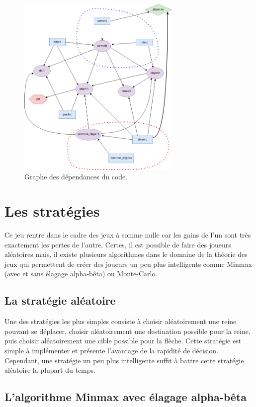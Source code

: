 \documentclass[a4paper]{article}
\begin{document}
\begin{figure}
    \centering
    \includegraphics[width=0.7\textwidth]{dep c.png}
    \caption{Graphe des dépendances du code.}
    \label{fig:dependance}
\end{figure}


\section{Les stratégies}
Ce jeu rentre dans le cadre des jeux à somme nulle car les gains de l'un sont très exactement les pertes de l'autre. Certes, il est possible de faire des joueurs aléatoires mais, il existe plusieurs algorithmes dans le domaine de la théorie des jeux qui permettent de créer des joueurs un peu plus intelligents comme Minmax (avec et sans élagage alpha-bêta) ou Monte-Carlo.
\subsection{La stratégie aléatoire}
Une des stratégies les plus simples consiste à choisir aléatoirement une reine pouvant se déplacer, choisir aléatoirement une destination possible pour la reine, puis choisir aléatoirement une cible possible pour la flèche.
Cette stratégie est simple à implémenter et présente l'avantage de la rapidité de décision.
Cependant, une stratégie un peu plus intelligente suffit à battre cette stratégie aléatoire la plupart du temps.

\subsection{L'algorithme Minmax avec élagage alpha-bêta}
\end{document}
